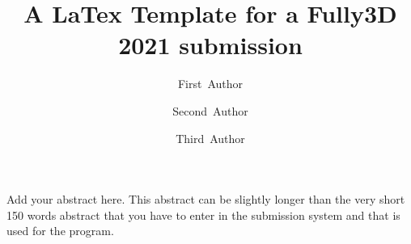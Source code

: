 \documentclass[11pt,twocolumn,twoside]{article}
\begin{document}
\title{A LaTex Template for a Fully3D 2021 submission} 

\author[1]{\small First~Author}
\author[1,2]{\small Second~Author}
\author[2]{\small Third~Author}



\maketitle
\thispagestyle{fancy}





\begin{customabstract}
Add your abstract here. This abstract can be slightly longer than the very short 
150 words abstract that you have to enter in the submission system and that is used 
for the program. 
\end{customabstract}






\printbibliography
\end{document}

